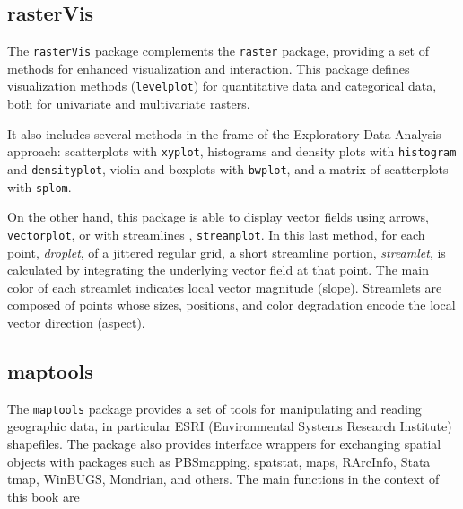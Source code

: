 \subsection{rasterVis}
\label{sec:rasterVis}

The \texttt{rasterVis} package \cite{Perpinan.Hijmans2013} complements
the \texttt{raster} package, providing a set of methods for enhanced
visualization and interaction. This package defines visualization
methods (\texttt{levelplot}) for quantitative data and categorical
data, both for univariate and multivariate rasters.

It also includes several methods in the frame of the Exploratory Data
Analysis approach: scatterplots with \texttt{xyplot}, histograms and
density plots with \texttt{histogram} and \texttt{densityplot}, violin
and boxplots with \texttt{bwplot}, and a matrix of scatterplots with
\texttt{splom}.

On the other hand, this package is able to display vector fields using
arrows, \texttt{vectorplot}, or with streamlines
\cite{Wegenkittl.Groeller1997}, \texttt{streamplot}. In this last
method, for each point, \emph{droplet}, of a jittered regular grid, a
short streamline portion, \emph{streamlet}, is calculated by
integrating the underlying vector field at that point. The main color
of each streamlet indicates local vector magnitude (slope). Streamlets
are composed of points whose sizes, positions, and color degradation
encode the local vector direction (aspect).


\subsection{maptools}
\label{sec:maptools}

The \texttt{maptools} package \cite{Bivand.Lewin-Koh2013} provides a
set of tools for manipulating and reading geographic data, in
particular ESRI (Environmental Systems Research Institute)
shapefiles. The package also provides interface wrappers for
exchanging spatial objects with packages such as PBSmapping, spatstat,
maps, RArcInfo, Stata tmap, WinBUGS, Mondrian, and others. The main
functions in the context of this book are

